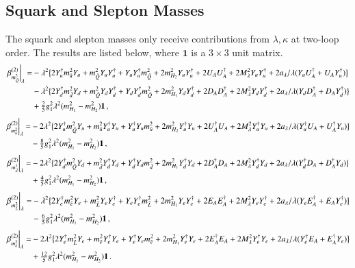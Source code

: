\documentclass[final,3p,times,pdflatex]{elsarticle}
\newcommand{\lamsq}{\lambda^2}
\newcommand{\mhusq}{m^2_{H_2}}
\newcommand{\mhdsq}{m^2_{H_1}}
\newcommand{\mlamsq}{M_\lambda^2}
\newcommand{\mqsq}{m_{\tilde{Q}}^2}
\newcommand{\mdsq}{m_{\tilde{d}}^2}
\newcommand{\musq}{m_{\tilde{u}}^2}
\newcommand{\mlsq}{m_{\tilde{L}}^2}
\newcommand{\mesq}{m_{\tilde{e}}^2}
\begin{document}
\subsection{Squark and Slepton Masses}
The squark and slepton masses only receive contributions from $\lambda,\kappa$ at two-loop order.  The results are listed below, where $\mathbf{1}$ is a $3\times 3$ unit matrix.
%
\begin{align}
\left.\beta_{\mqsq}^{(2)}\right|_\lambda =& -\lamsq \big\{ 2 Y_u^\dagger\musq Y_u + \mqsq Y_u Y_u^\dagger +  Y_u Y_u^\dagger\mqsq \notag 
+ 2\mhusq Y_u Y_u^\dagger + 2 U_A U_A^\dagger + 2\mlamsq Y_u Y_u^\dagger 
+ 2a_\lambda/\lambda(  Y_u U_A^\dagger +  U_A Y_u^\dagger) \big\} \notag \\
%
&-\lamsq\big\{ 2 Y_d^\dagger\mdsq Y_d + \mqsq Y_d Y_d^\dagger +  Y_d Y_d^\dagger\mqsq 
+ 2\mhdsq Y_d Y_d^\dagger + 2 D_A D_A^\dagger + 2\mlamsq Y_d Y_d^\dagger 
+ 2a_\lambda/\lambda(  Y_d D_A^\dagger +  D_A Y_d^\dagger) \big\} \notag \\
%
&+ \tfrac{2}{5}g_1^2\lamsq(\mhdsq - \mhusq)\mathbf{1}\,,
\end{align}
%
%
\begin{align}
\left.\beta_{\musq}^{(2)}\right|_\lambda =& -2\lamsq \big\{ 2 Y_u^\dagger\mqsq Y_u + \musq Y_u^\dagger Y_u +  Y_u^\dagger Y_u\musq 
+ 2\mhusq Y_u^\dagger Y_u + 2 U_A^\dagger U_A + 2\mlamsq Y_u^\dagger Y_u 
+ 2a_\lambda/\lambda(  Y_u^\dagger U_A +  U_A^\dagger Y_u) \big\}  \notag \\
%
&- \tfrac{8}{5}g_1^2\lamsq(\mhdsq - \mhusq)\mathbf{1}\,,
\end{align}
%
%
\begin{align}
\left.\beta_{\mdsq}^{(2)}\right|_\lambda =& -2\lamsq \big\{ 2 Y_d^\dagger\mqsq Y_d + \mdsq Y_d^\dagger Y_d +  Y_d^\dagger Y_d\mdsq 
+ 2\mhdsq Y_d^\dagger Y_d + 2 D_A^\dagger D_A + 2\mlamsq Y_d^\dagger Y_d 
+ 2a_\lambda/\lambda(  Y_d^\dagger D_A +  D_A^\dagger Y_d) \big\} \notag \\
%
&+ \tfrac{4}{5}g_1^2\lamsq(\mhdsq - \mhusq)\mathbf{1}\,,
\end{align}
%
%
\begin{align}
\left.\beta_{\mlsq}^{(2)}\right|_\lambda =& -\lamsq \big\{ 2 Y_e^\dagger\mesq Y_e + \mlsq Y_e Y_e^\dagger +  Y_e Y_e^\dagger\mlsq 
+ 2\mhdsq Y_e Y_e^\dagger + 2 E_A E_A^\dagger + 2\mlamsq Y_e Y_e^\dagger 
+ 2a_\lambda/\lambda(  Y_e E_A^\dagger +  E_A Y_e^\dagger) \big\} \notag \\
%
&- \tfrac{6}{5}g_1^2\lamsq(\mhdsq - \mhusq)\mathbf{1}\,,
\end{align}
%
%
\begin{align}
\left.\beta_{\mesq}^{(2)}\right|_\lambda =& -2\lamsq \big\{ 2 Y_e^\dagger\mlsq Y_e + \mesq Y_e^\dagger Y_e +  Y_e^\dagger Y_e\mesq 
+ 2\mhdsq Y_e^\dagger Y_e + 2 E_A^\dagger E_A + 2\mlamsq Y_e^\dagger Y_e
+ 2a_\lambda/\lambda(  Y_e^\dagger E_A +  E_A^\dagger Y_e) \big\} \notag \\
%
&+ \tfrac{12}{5}g_1^2\lamsq(\mhdsq - \mhusq)\mathbf{1}\,.
\end{align}
\end{document}
